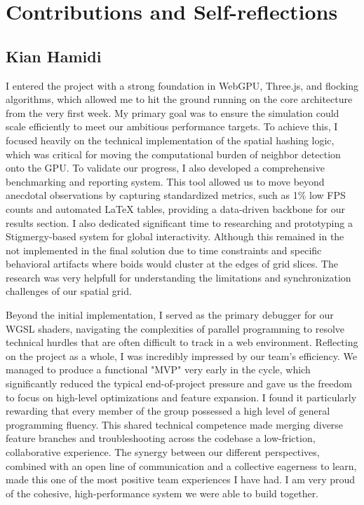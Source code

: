 \documentclass[a4paper, 12pt]{article}
\begin{document}

\section{Contributions and Self-reflections}

\subsection*{Kian Hamidi}

I entered the project with a strong foundation in WebGPU, Three.js, and flocking algorithms, which
allowed me to hit the ground running on the core architecture from the very first week. My primary
goal was to ensure the simulation could scale efficiently to meet our ambitious performance targets.
To achieve this, I focused heavily on the technical implementation of the spatial hashing logic, which
was critical for moving the computational burden of neighbor detection onto the GPU. To validate our
progress, I also developed a comprehensive benchmarking and reporting system. This tool allowed us
to move beyond anecdotal observations by capturing standardized metrics, such as 1\% low FPS counts
and automated LaTeX tables, providing a data-driven backbone for our results section. I also dedicated
significant time to researching and prototyping a Stigmergy-based system for global interactivity.
Although this remained in the not implemented in the final solution due to time constraints and specific behavioral
artifacts where boids would cluster at the edges of grid slices. The research was very helpfull for
understanding the limitations and synchronization challenges of our spatial grid.

Beyond the initial implementation, I served as the primary debugger for our WGSL shaders, navigating
the complexities of parallel programming to resolve technical hurdles that are often difficult to
track in a web environment. Reflecting on the project as a whole, I was incredibly impressed by our
team's efficiency. We managed to produce a functional "MVP" very early in the cycle, which significantly
reduced the typical end-of-project pressure and gave us the freedom to focus on high-level optimizations
and feature expansion. I found it particularly rewarding that every member of the group possessed a
high level of general programming fluency. This shared technical competence made merging diverse
feature branches and troubleshooting across the codebase a low-friction, collaborative experience.
The synergy between our different perspectives, combined with an open line of communication and a
collective eagerness to learn, made this one of the most positive team experiences I have had. I am
very proud of the cohesive, high-performance system we were able to build together.
\end{document}
